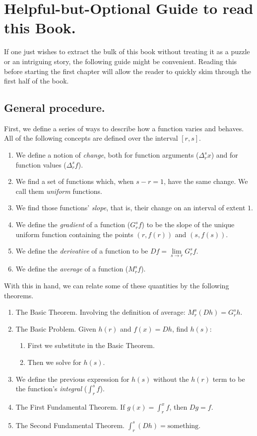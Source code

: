 \section{Helpful-but-Optional Guide to read this Book.}

If one just wishes to extract the bulk of this book without treating it as a puzzle or an intriguing story, the following guide might be convenient. Reading this before starting the first chapter will allow the reader to quickly skim through the first half of the book.

\subsection{General procedure.}

First, we define a series of ways to describe how a function varies and behaves. All of the following concepts are defined over the interval $[r, s]$.

\begin{enumerate}
	\item We define a notion of \textit{change}, both for function arguments ($\Delta_r^s x$) and for function values ($\Delta_r^s f$).
	\item We find a set of functions which, when $s - r = 1$, have the same change. We call them \textit{uniform} functions.
	\item We find those functions' \textit{slope}, that is, their change on an interval of extent $1$.
	\item We define the \textit{gradient} of a function ($G_r^s f$) to be the slope of the unique uniform function containing the points $(r, f(r))$ and $(s, f(s))$.
	\item We define the \textit{derivative} of a function to be $Df = \lim\limits_{s \to r} G_r^s f$.
	\item We define the \textit{average} of a function ($M_r^s f$).
\end{enumerate}

With this in hand, we can relate some of these quantities by the following theorems.

\begin{enumerate}
	\item The Basic Theorem. Involving the definition of average: $M_r^s (Dh) = G_r^s h$.
	\item The Basic Problem. Given $h(r)$ and $f(x) = Dh$, find $h(s)$:
		\begin{enumerate}
			\item First we substitute in the Basic Theorem.
			\item Then we solve for $h(s)$.
		\end{enumerate}
	\item We define the previous expression for $h(s)$ without the $h(r)$ term to be the function's \textit{integral} ($\int_r^s f$).
	\item The First Fundamental Theorem. If $g(x) = \int_r^x f$, then $Dg = f$.
	\item The Second Fundamental Theorem. $\int_r^s (Dh) = \textrm{something}$.
\end{enumerate}


